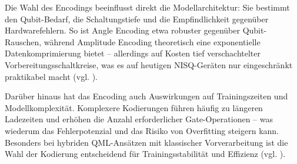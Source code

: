 Die Wahl des Encodings beeinflusst direkt die Modellarchitektur: Sie bestimmt den Qubit-Bedarf, die Schaltungstiefe und die Empfindlichkeit gegenüber Hardwarefehlern. So ist Angle Encoding etwa robuster gegenüber Qubit-Rauschen, während Amplitude Encoding theoretisch eine exponentielle Datenkomprimierung bietet – allerdings auf Kosten tief verschachtelter Vorbereitungsschaltkreise, was es auf heutigen NISQ-Geräten nur eingeschränkt praktikabel macht (vgl. \cite{schuld_supervised_2018}).

Darüber hinaus hat das Encoding auch Auswirkungen auf Trainingszeiten und Modellkomplexität. Komplexere Kodierungen führen häufig zu längeren Ladezeiten und erhöhen die Anzahl erforderlicher Gate-Operationen – was wiederum das Fehlerpotenzial und das Risiko von Overfitting steigern kann. Besonders bei hybriden QML-Ansätzen mit klassischer Vorverarbeitung ist die Wahl der Kodierung entscheidend für Trainingsstabilität und Effizienz (vgl. \cite{schuld_supervised_2018}).



